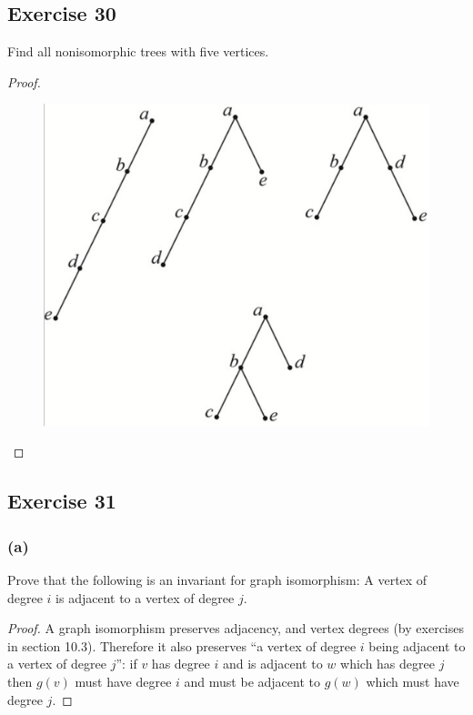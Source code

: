 \documentclass[14pt]{extarticle}
\begin{document}
\subsection{Exercise 30}
Find all nonisomorphic trees with five vertices.
\begin{proof}
    \begin{figure}[ht!]
        \centering
        \includegraphics[scale=0.2]{../images/10.4.30.png}
    \end{figure}
\end{proof}

\subsection{Exercise 31}
\subsubsection{(a)}
Prove that the following is an invariant for graph isomorphism: A vertex of degree \(i\) is adjacent to a vertex
of degree \(j\).

\begin{proof}
    A graph isomorphism preserves adjacency, and vertex degrees (by exercises in section 10.3). Therefore it also preserves
    ``a vertex of degree \(i\) being adjacent to a vertex of degree \(j\)'': if \(v\) has degree \(i\) and is adjacent to
    \(w\) which has degree \(j\) then \(g(v)\) must have degree \(i\) and must be adjacent to \(g(w)\) which must have degree
    \(j\).
\end{proof}
\end{document}
